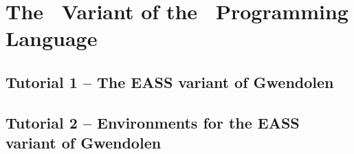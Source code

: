 %
\chapter{The \eass\ Variant of the \gwendolen\ Programming Language}

\section{Tutorial 1 -- The EASS variant of Gwendolen}

{
  \let\section\subsection
  \let\subsection\subsubsection
  \let\subsubsection\paragraph
  
  
  }

\section{Tutorial 2 -- Environments for the EASS variant of Gwendolen}

{
  \let\section\subsection
  \let\subsection\subsubsection
  \let\subsubsection\paragraph
  
  
  }

